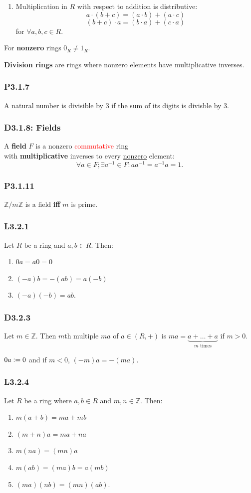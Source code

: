\documentclass{article}
\newcommand{\deq}{\vcentcolon=}
\begin{document}
\begin{multicols*}{3}
\begin{enumerate}
    \item Multiplication in $R$ with respect to addition
    is distributive:
    $$a\cdot(b+c)=(a\cdot b)+(a\cdot c)$$
    $$(b+c)\cdot a=(b\cdot a)+(c\cdot a)$$
    for $\forall a,b,c\in R$.
\end{enumerate}
For \textbf{nonzero} rings $0_R\neq1_R$.

\textbf{Division rings} are rings where nonzero elements
have multiplicative inverses.

\subsubsection*{P3.1.7}
A natural number is divisible by $3$ if
the sum of its digits is divisble by $3$.

\subsubsection*{D3.1.8: Fields}
A \textbf{field} $F$ is a nonzero \textcolor{red}{commutative} ring \\
with \textbf{multiplicative} inverses to every
\underline{nonzero} element:
$$\forall a\in F;\exists a^{-1}\in F:
aa^{-1}=a^{-1}a=1.$$

\subsubsection*{P3.1.11}
$\mathbb{Z}/m\mathbb{Z}$
is a field \textbf{if{}f} $m$ is prime.

\subsubsection*{L3.2.1}
Let $R$ be a ring and $a,b\in R$. Then:
\begin{enumerate}
    \item $0a=a0=0$
    \item $(-a)b=-(ab)=a(-b)$
    \item $(-a)(-b)=ab$.
\end{enumerate}

\subsubsection*{D3.2.3}
Let $m\in\mathbb{Z}$. Then $m$th multiple $ma$ of
$a\in(R,+)$ is $ma=\underbrace{a+\dots+a}_
\text{$m$ times}$ if $m>0$.

$0a\deq0$ and if $m<0$, $(-m)a=-(ma)$.

\subsubsection*{L3.2.4}
Let $R$ be a ring where $a,b\in R$ and
$m,n\in\mathbb{Z}$. Then:
\begin{enumerate}
    \item $m(a+b)=ma+mb$
    \item $(m+n)a=ma+na$
    \item $m(na)=(mn)a$
    \item $m(ab)=(ma)b=a(mb)$
    \item $(ma)(nb)=(mn)(ab).$
\end{enumerate}


\end{multicols*}
\end{document}
